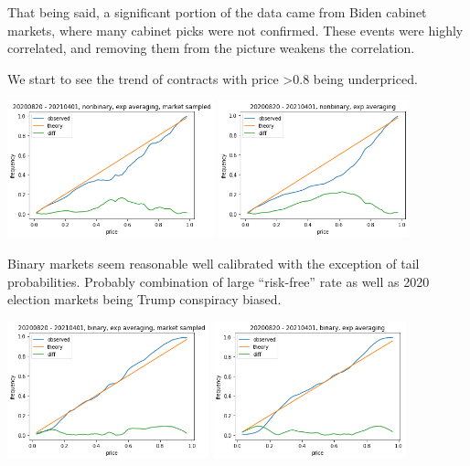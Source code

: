 \documentclass[
]{article}
\begin{document}
That being said, a significant portion of the data came from Biden
cabinet markets, where many cabinet picks were not confirmed. These
events were highly correlated, and removing them from the picture
weakens the correlation.

We start to see the trend of contracts with price \textgreater0.8 being
underpriced.

\includegraphics[width=\textwidth,height=1.5625in]{all_nonbinary_market_sampled.png}
\includegraphics[width=\textwidth,height=1.5625in]{all_nonbinary.png}

Binary markets seem reasonable well calibrated with the exception of
tail probabilities. Probably combination of large ``risk-free'' rate as
well as 2020 election markets being Trump conspiracy biased.

\includegraphics[width=\textwidth,height=1.5625in]{_binary_market_sampled.png}
\includegraphics[width=\textwidth,height=1.5625in]{_binary.png}
\end{document}
